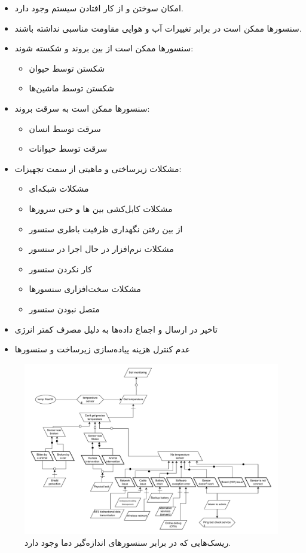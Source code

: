 \documentclass[a4paper]{report}
\begin{document}
\begin{itemize}
    \item امکان سوختن و از کار افتادن سیستم وجود دارد.
    \item سنسور‌ها ممکن است در برابر تغییرات آب و هوایی مقاومت مناسبی نداشته باشند.
    \item سنسور‌ها ممکن است از بین بروند و شکسته شوند:
    \begin{itemize}
        \item شکستن توسط حیوان
        \item شکستن توسط ماشین‌ها
    \end{itemize}
    \item سنسور‌ها ممکن است به سرقت بروند:
    \begin{itemize}
        \item سرقت توسط انسان
        \item سرقت توسط حیوانات
    \end{itemize}
    \item مشکلات زیرساختی و ماهیتی از سمت تجهیزات:
    \begin{itemize}
        \item مشکلات شبکه‌ای
        \item مشکلات کابل‌کشی بین ها و حتی سرور‌ها
        \item از بین رفتن نگهداری ظرفیت باطری سنسور
        \item مشکلات نرم‌افزار در حال اجرا در سنسور
        \item کار نکردن سنسور
        \item مشکلات سخت‌افزاری سنسور‌ها
        \item متصل نبودن سنسور
    \end{itemize}
    \item تاخیر در ارسال و اجماع داده‌ها به دلیل مصرف کمتر انرژی
    \item عدم کنترل هزینه پیاده‌سازی زیرساخت و سنسور‌ها
\end{itemize}

\begin{figure}[H]
    \centering
    \includegraphics[width=1.0\textwidth]{assets/diagrams/risk_soil_monitoring.drawio.pdf}
    \caption{ریسک‌هایی که در برابر سنسور‌های اندازه‌گیر دما وجود دارد.}
\end{figure}
\end{document}
